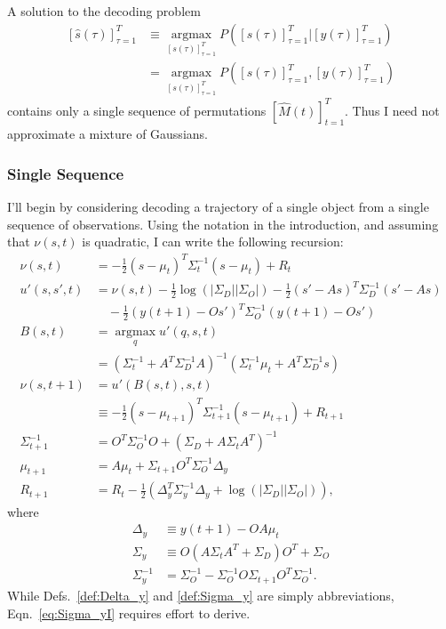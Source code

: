 \documentclass[12pt]{article}
\newcommand{\os}[4]{{\left[ #1(#2) \right]}_{#3}^{#4}} %
\newcommand{\ti}[2]{{#1}{(#2)}}                         %
\newcommand{\ts}[4]{\os{#1}{#2}{#2=#3}{#4}} %
\newcommand{\argmax}{\operatorname*{argmax}}
\newcommand{\logdet}{\log\left(\left|\Sigma_D\right| \left| \Sigma_O
    \right| \right)}
\begin{document}
A solution to the decoding problem
\begin{align*}
  \ts{\hat s}{\tau}{1}{T} &\equiv \argmax_{\ts{s}{\tau}{1}{T}}
  P(\ts{s}{\tau}{1}{T}|\ts{y}{\tau}{1}{T}) \\
            &=  \argmax_{\ts{s}{\tau}{1}{T}} P(\ts{s}{\tau}{1}{T},\ts{y}{\tau}{1}{T})
\end{align*}
contains only a single sequence of permutations $\ts{\hat
  M}{t}{1}{T}$.  Thus I need not approximate a mixture of Gaussians.

\subsubsection{Single Sequence}
\label{sec:single-sequence}

I'll begin by considering decoding a trajectory of a single object
from a single sequence of observations.  Using the notation in the
introduction, and assuming that $\nu(s,t)$ is quadratic, I can write
the following recursion:
\begin{align}
  \nu(s,t) &= -\frac{1}{2}(s-\mu_{t})^T
    \Sigma_{t}^{-1}(s-\mu_{t}) + R_t \nonumber \\
  \label{eq:decode_u'}
  u'(s,s',t) &= \nu(s,t) -\frac{1}{2} \logdet  - 
  \frac{1}{2}(s'-As)^T \Sigma_{D}^{-1} (s'-As)  \nonumber \\
  &\quad - \frac{1}{2}(\ti{y}{t+1} - O s')^T \Sigma_{O}^{-1}(\ti{y}{t+1}
    - O s') \\
  B(s,t) &= \argmax_{q} u'(q,s,t) \nonumber \\
  \label{eq:decode_B}
  &= \left( \Sigma_t^{-1} + A^T \Sigma_D^{-1} A \right)^{-1} \left(
    \Sigma_t^{-1} \mu_t + A^T \Sigma_D^{-1} s \right) \\
  \nu(s,t+1) &= u'(B(s,t),s,t) \nonumber \\
  &\equiv  -\frac{1}{2}(s-\mu_{t+1})^T
  \Sigma_{t+1}^{-1}(s-\mu_{t+1}) + R_{t+1} \nonumber \\
  \label{eq:new_Sigma}
  \Sigma_{t+1}^{-1} & = O^T\Sigma_O^{-1} O + \left( \Sigma_D + A \Sigma_t
    A^T \right)^{-1} \\
  \label{eq:new_mu}
  \mu_{t+1} &= A \mu_t + \Sigma_{t+1} O^T \Sigma_O^{-1} \Delta_y \\
  \label{eq:new_R}
  R_{t+1} &= R_t -\frac{1}{2} \left( \Delta_y^T \Sigma_y^{-1} \Delta_y
    + \logdet \right),
\end{align}
where
\begin{align}
  \label{def:Delta_y}
  \Delta_y &\equiv \ti{y}{t+1} - OA \mu_t \\
  \label{def:Sigma_y}
  \Sigma_y &\equiv O(A\Sigma_t A^T + \Sigma_D)O^T + \Sigma_O \\
  \label{eq:Sigma_yI}
  \Sigma_y^{-1} &= \Sigma_O^{-1} - \Sigma_O^{-1} O \Sigma_{t+1} O^T
  \Sigma_O^{-1}.
\end{align}
While Defs.~\eqref{def:Delta_y} and  \eqref{def:Sigma_y} are simply
abbreviations, Eqn.~\eqref{eq:Sigma_yI} requires effort to derive.
\end{document}
